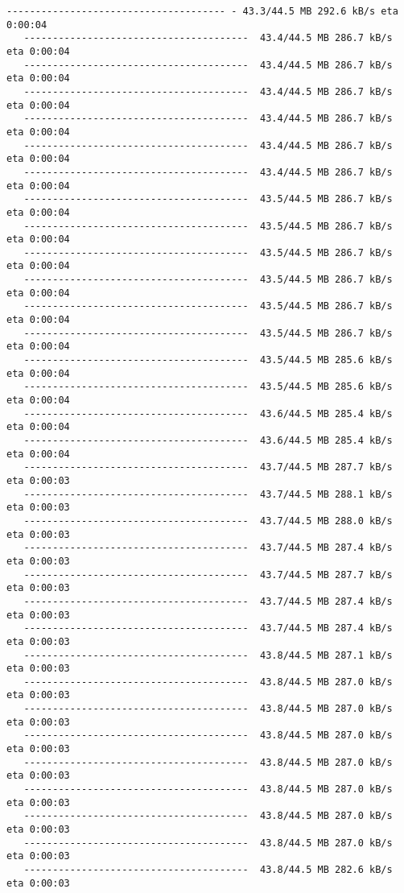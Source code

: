 \documentclass[11pt]{article}
\begin{document}
\begin{Verbatim}[commandchars=\\\{\}]
   -------------------------------------- - 43.3/44.5 MB 292.6 kB/s eta 0:00:04
   ---------------------------------------  43.4/44.5 MB 286.7 kB/s eta 0:00:04
   ---------------------------------------  43.4/44.5 MB 286.7 kB/s eta 0:00:04
   ---------------------------------------  43.4/44.5 MB 286.7 kB/s eta 0:00:04
   ---------------------------------------  43.4/44.5 MB 286.7 kB/s eta 0:00:04
   ---------------------------------------  43.4/44.5 MB 286.7 kB/s eta 0:00:04
   ---------------------------------------  43.4/44.5 MB 286.7 kB/s eta 0:00:04
   ---------------------------------------  43.5/44.5 MB 286.7 kB/s eta 0:00:04
   ---------------------------------------  43.5/44.5 MB 286.7 kB/s eta 0:00:04
   ---------------------------------------  43.5/44.5 MB 286.7 kB/s eta 0:00:04
   ---------------------------------------  43.5/44.5 MB 286.7 kB/s eta 0:00:04
   ---------------------------------------  43.5/44.5 MB 286.7 kB/s eta 0:00:04
   ---------------------------------------  43.5/44.5 MB 286.7 kB/s eta 0:00:04
   ---------------------------------------  43.5/44.5 MB 285.6 kB/s eta 0:00:04
   ---------------------------------------  43.5/44.5 MB 285.6 kB/s eta 0:00:04
   ---------------------------------------  43.6/44.5 MB 285.4 kB/s eta 0:00:04
   ---------------------------------------  43.6/44.5 MB 285.4 kB/s eta 0:00:04
   ---------------------------------------  43.7/44.5 MB 287.7 kB/s eta 0:00:03
   ---------------------------------------  43.7/44.5 MB 288.1 kB/s eta 0:00:03
   ---------------------------------------  43.7/44.5 MB 288.0 kB/s eta 0:00:03
   ---------------------------------------  43.7/44.5 MB 287.4 kB/s eta 0:00:03
   ---------------------------------------  43.7/44.5 MB 287.7 kB/s eta 0:00:03
   ---------------------------------------  43.7/44.5 MB 287.4 kB/s eta 0:00:03
   ---------------------------------------  43.7/44.5 MB 287.4 kB/s eta 0:00:03
   ---------------------------------------  43.8/44.5 MB 287.1 kB/s eta 0:00:03
   ---------------------------------------  43.8/44.5 MB 287.0 kB/s eta 0:00:03
   ---------------------------------------  43.8/44.5 MB 287.0 kB/s eta 0:00:03
   ---------------------------------------  43.8/44.5 MB 287.0 kB/s eta 0:00:03
   ---------------------------------------  43.8/44.5 MB 287.0 kB/s eta 0:00:03
   ---------------------------------------  43.8/44.5 MB 287.0 kB/s eta 0:00:03
   ---------------------------------------  43.8/44.5 MB 287.0 kB/s eta 0:00:03
   ---------------------------------------  43.8/44.5 MB 287.0 kB/s eta 0:00:03
   ---------------------------------------  43.8/44.5 MB 282.6 kB/s eta 0:00:03

\end{Verbatim}
\end{document}
